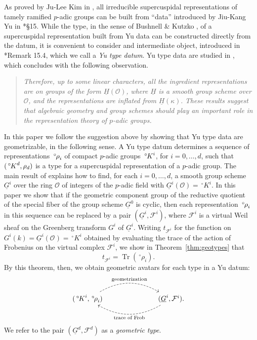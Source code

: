 \documentclass[10pt]{amsart}
\theoremstyle{plain}
\theoremstyle{definition}
\newcommand{\OO}[1]{\mathcal{O}_{#1}}
\DeclareMathOperator{\trace}{Tr}
\newcommand{\trFrob}[1]{t_{#1}}
\newcommand{\cs}[1]{{\mathcal{#1}}}
\renewcommand{\O}{{\mathcal{O}}}
\newcommand{\oK}{{\,^\circ \hskip-1pt K}}
\newcommand{\orho}{{\,^\circ \hskip-1pt \rho}}
\begin{document}
As proved by Ju-Lee Kim in \cite{kim:07a}, all irreducible supercuspidal representations of tamely ramified $p$-adic groups can be built from ``data'' introduced by Jiu-Kang Yu in \cite{yu:01a}*{\S 15}.
While the type, in the sense of Bushnell \& Kutzko \cite{bushnell-kutzko:98a}, of a supercuspidal representation built from Yu data can be constructed directly from the datum, it is convenient to consider and intermediate object, introduced in \cite{yu:01a}*{Remark 15.4}, which we call a \emph{Yu type datum}. 
Yu type data are studied in \cite{Yu:models}, which concludes with the following observation.
%
\begin{quotation}
{\it Therefore, up to some linear characters, all the ingredient representations 
 are on groups of the form $\underline{H}(\mathcal{O})$, where $\underline{H}$ is a smooth group scheme over $\mathcal{O}$, and the representations are inflated from $\underline{H}(\kappa)$. These results suggest that algebraic geometry and group schemes should play an
important role in the representation theory of $p$-adic groups.} %
\end{quotation}
%
In this paper we follow the suggestion above by showing that Yu type data are geometrizable, in the following sense.
A Yu type datum determines a sequence of representations $\orho_i$ of compact $p$-adic groups $\oK^i$, for $i=0, \ldots, d$, such that $(\oK^d, \rho_d)$ is a type for a supercuspidal representation of a $p$-adic group.
The main result of \cite{Yu:models} explains how to find, for each $i=0, \ldots, d$, a smooth group scheme $\underline{G}^i$ over the ring $\O$ of integers of the $p$-adic field with $\underline{G}^i(\O)=\,^\circ K^i $.
In this paper we show that if the geometric component group of the reductive quotient of the special fiber of the group scheme $\underline{G}^0$ is cyclic, then each representation $\orho_i$ in this sequence can be replaced by a pair $(\underline{G}^i, \cs{F}^i)$, 
where $\cs{F}^i$ is a virtual Weil sheaf on the Greenberg transform $G^i$ of $\underline{G}^i$.  
Writing $\trFrob{\cs{F}^i}$ for the function on $G^i(k) = \underline{G}^i(\OO{}) = \,^\circ K^i$ obtained by evaluating the trace of the action of Frobenius on the virtual complex $\cs{F}^i$, we show in Theorem~\ref{thm:geotypes} that 
\begin{equation}\label{eqn:intro1}
\trFrob{\cs{F}^i} = \trace(\,^\circ\rho_i).
\end{equation}
By this theorem, then, we obtain geometric avatars for each type in a Yu datum:
\[
\begin{tikzcd}
(\oK^i,\orho_i) \arrow[bend left, dashed]{rrr}{\text{geometrization}} &&& \arrow[bend left, dashed]{lll}{\text{trace of Frob}}
(\underline{G}^i, \cs{F}^i).
\end{tikzcd}
\]
We refer to the pair $(\underline{G}^d, \cs{F}^d)$ as a \emph{geometric type}.
\end{document}
